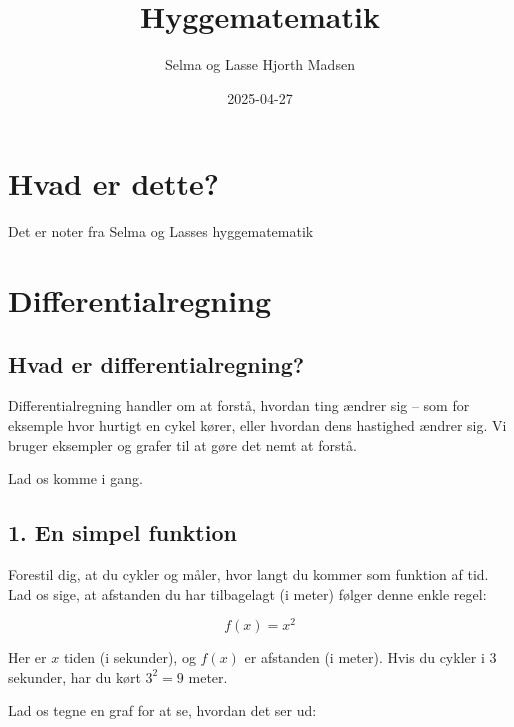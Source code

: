 \documentclass[
  letterpaper,
  DIV=11,
  numbers=noendperiod]{scrreprt}
\title{Hyggematematik}
\author{Selma og Lasse Hjorth Madsen}
\date{2025-04-27}
\renewcommand*\contentsname{Indholdsfortegnelse}
\newcommand\contentsname{Indholdsfortegnelse}
\begin{document}
\maketitle

\renewcommand*\contentsname{Indholdsfortegnelse}
{
\hypersetup{linkcolor=}
\setcounter{tocdepth}{2}
\tableofcontents
}

\chapter*{Hvad er dette?}\label{hvad-er-dette}


Det er noter fra Selma og Lasses hyggematematik


\chapter{Differentialregning}\label{differentialregning}

\section{Hvad er
differentialregning?}\label{hvad-er-differentialregning}

Differentialregning handler om at forstå, hvordan ting ændrer sig -- som
for eksemple hvor hurtigt en cykel kører, eller hvordan dens hastighed
ændrer sig. Vi bruger eksempler og grafer til at gøre det nemt at
forstå.

Lad os komme i gang.

\section{1. En simpel funktion}\label{en-simpel-funktion}

Forestil dig, at du cykler og måler, hvor langt du kommer som funktion
af tid. Lad os sige, at afstanden du har tilbagelagt (i meter) følger
denne enkle regel:

\[f(x) = x^2\]

Her er \(x\) tiden (i sekunder), og \(f(x)\) er afstanden (i meter).
Hvis du cykler i 3 sekunder, har du kørt \(3^2 = 9\) meter.

Lad os tegne en graf for at se, hvordan det ser ud:
\end{document}
